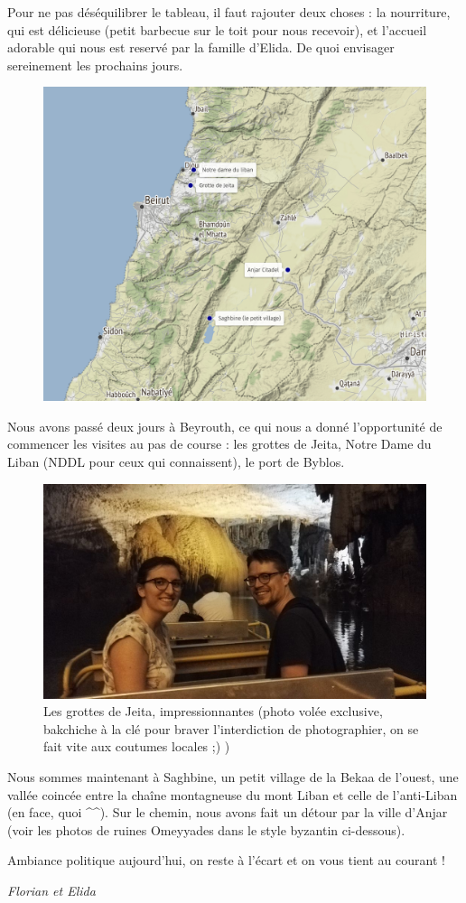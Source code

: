 Pour ne pas déséquilibrer le tableau, il faut rajouter deux choses : la
nourriture, qui est délicieuse (petit barbecue sur le toit pour nous
recevoir), et l'accueil adorable qui nous est reservé par la famille
d'Elida. De quoi envisager sereinement les prochains jours.

\begin{figure}
\centering
\includegraphics{maps/Liban1.png}
\end{figure}

Nous avons passé deux jours à Beyrouth, ce qui nous a donné
l'opportunité de commencer les visites au pas de course : les grottes de
Jeita, Notre Dame du Liban (NDDL pour ceux qui connaissent), le port de
Byblos.

\begin{figure}
\centering
\includegraphics{images/20180506_Jeita.jpg}
\caption{Les grottes de Jeita, impressionnantes (photo volée exclusive,
bakchiche à la clé pour braver l'interdiction de photographier, on se
fait vite aux coutumes locales ;) )}
\end{figure}

Nous sommes maintenant à Saghbine, un petit village de la Bekaa de
l'ouest, une vallée coincée entre la chaîne montagneuse du mont Liban et
celle de l'anti-Liban (en face, quoi \^{}\^{}). Sur le chemin, nous
avons fait un détour par la ville d'Anjar (voir les photos de ruines
Omeyyades dans le style byzantin ci-dessous).

Ambiance politique aujourd'hui, on reste à l'écart et on vous tient au
courant !

\emph{Florian et Elida}
